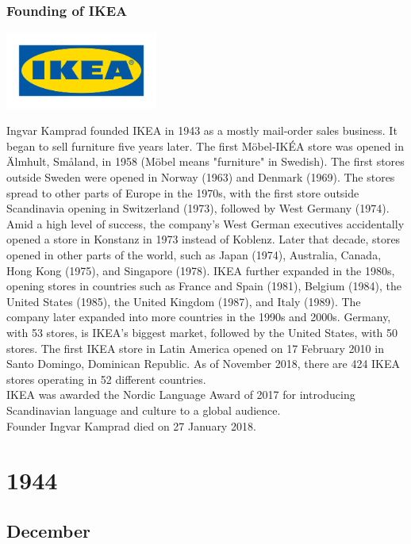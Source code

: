 \documentclass[11pt]{report}
\begin{document}
\subsection{Founding of IKEA}
\vspace{2mm}\begin{center}\includegraphics[width=5cm]{./img/ikeaLogo.jpg}\end{center}
Ingvar Kamprad founded IKEA in 1943 as a mostly mail-order sales business. It began to sell furniture five years later. The first Möbel-IKÉA store was opened in Älmhult, Småland, in 1958 (Möbel means "furniture" in Swedish). The first stores outside Sweden were opened in Norway (1963) and Denmark (1969). The stores spread to other parts of Europe in the 1970s, with the first store outside Scandinavia opening in Switzerland (1973), followed by West Germany (1974).\\ 
\indent Amid a high level of success, the company's West German executives accidentally opened a store in Konstanz in 1973 instead of Koblenz. Later that decade, stores opened in other parts of the world, such as Japan (1974), Australia, Canada, Hong Kong (1975), and Singapore (1978). IKEA further expanded in the 1980s, opening stores in countries such as France and Spain (1981), Belgium (1984), the United States (1985), the United Kingdom (1987), and Italy (1989). The company later expanded into more countries in the 1990s and 2000s. Germany, with 53 stores, is IKEA's biggest market, followed by the United States, with 50 stores. The first IKEA store in Latin America opened on 17 February 2010 in Santo Domingo, Dominican Republic. As of November 2018, there are 424 IKEA stores operating in 52 different countries.\\ \indent IKEA was awarded the Nordic Language Award of 2017 for introducing Scandinavian language and culture to a global audience.\\
\indent Founder Ingvar Kamprad died on 27 January 2018.

\chapter{1944}
\section{December}
\end{document}
